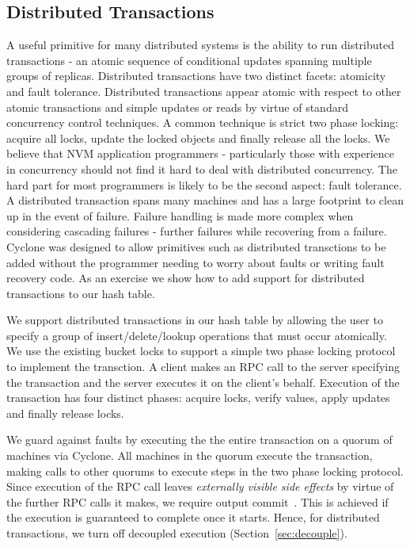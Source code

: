 \documentclass[10pt, preprint]{sigplanconf}
\begin{document}
\subsection{Distributed Transactions}
A useful primitive for many distributed systems is the ability to run
distributed transactions - an atomic sequence of conditional updates spanning
multiple groups of replicas. Distributed transactions have two distinct facets:
atomicity and fault tolerance. Distributed transactions appear atomic with
respect to other atomic transactions and simple updates or reads by virtue of
standard concurrency control techniques. A common technique is strict two phase
locking: acquire all locks, update the locked objects and finally release all
the locks. We believe that NVM application programmers - particularly those
with experience in concurrency should not find it hard to deal with
distributed concurrency. The hard part for most programmers is likely to be the
second aspect: fault tolerance. A distributed transaction spans many machines
and has a large footprint to clean up in the event of failure. Failure handling
is made more complex when considering cascading failures - further failures
while recovering from a failure. Cyclone was designed to allow primitives such
as distributed transctions to be added without the programmer needing to worry
about faults or writing fault recovery code. As an exercise we show how to add
support for distributed transactions to our hash table.

We support distributed transactions in our hash table by allowing the user to
specify a group of insert/delete/lookup operations that must occur
atomically. We use the existing bucket locks to support a simple two phase
locking protocol to implement the transction. A client makes an RPC call to the
server specifying the transaction and the server executes it on the client's
behalf. Execution of the transaction has four distinct phases: acquire locks,
verify values, apply updates and finally release locks.

We guard against faults by executing the the entire transaction on a quorum of
machines via Cyclone. All machines in the quorum execute the transaction, making
calls to other quorums to execute steps in the two phase locking protocol. Since
execution of the RPC call leaves \emph{externally visible side effects} by
virtue of the further RPC calls it makes, we require output
commit~\cite{output_commit}. This is achieved if the execution is guaranteed to
complete once it starts. Hence, for distributed transactions, we turn off
decoupled execution (Section~\ref{sec:decouple}).
\end{document}
